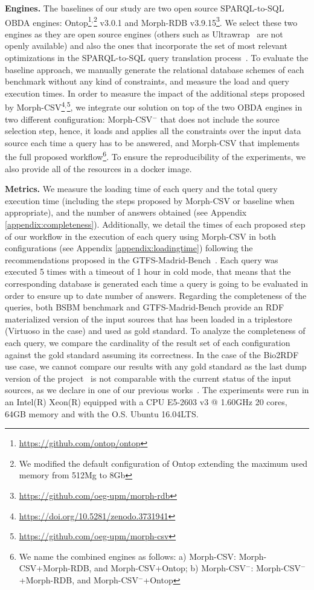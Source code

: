 \noindent\textbf{Engines.} The baselines of our study are two open source SPARQL-to-SQL OBDA engines: Ontop\footnote{\url{https://github.com/ontop/ontop}}$^,$\footnote{We modified the default configuration of Ontop extending the maximum used memory from 512Mg to 8Gb} v3.0.1 and Morph-RDB v3.9.15\footnote{\url{https://github.com/oeg-upm/morph-rdb}}. We select these two engines as they are open source engines (others such as Ultrawrap~\citep{sequeda2013ultrawrap} are not openly available) and also the ones that incorporate the set of most relevant optimizations in the SPARQL-to-SQL query translation process~\citep{priyatna2014formalisation,rodriguez2015efficient}.  To evaluate the baseline approach, we manually generate the relational database schemes of each benchmark without any kind of constraints, and measure the load and query execution times. In order to measure the impact of the additional steps proposed by Morph-CSV\footnote{\url{https://doi.org/10.5281/zenodo.3731941}}$^,$\footnote{\url{https://github.com/oeg-upm/morph-csv}}, we integrate our solution on top of the two OBDA engines in two different configuration: Morph-CSV$^-$ that does not include the source selection step, hence, it loads and applies all the constraints over the input data source each time a query has to be answered, and Morph-CSV that implements the full proposed workflow\footnote{We name the combined engines as follows: a) Morph-CSV: Morph-CSV+Morph-RDB, and Morph-CSV+Ontop; b) Morph-CSV$^-$: Morph-CSV$^-$+Morph-RDB, and Morph-CSV$^-$+Ontop}. To ensure the reproducibility of the experiments, we also provide all of the resources in a docker image.

\noindent\textbf{Metrics.} We measure the loading time of each query and the total query execution time (including the steps proposed by Morph-CSV or baseline when appropriate), and the number of answers obtained (see Appendix \ref{appendix:completeness}). Additionally, we detail the times of each proposed step of our workflow in the execution of each query using Morph-CSV in both configurations (see Appendix \ref{appendix:loadingtime}) following the recommendations proposed in the GTFS-Madrid-Bench~\citep{chaves2020gtfs}. Each query was executed 5 times with a timeout of 1 hour in cold mode, that means that the corresponding database is generated each time a query is going to be evaluated in order to ensure up to date number of answers. Regarding the completeness of the queries, both BSBM benchmark and GTFS-Madrid-Bench provide an RDF materialized version of the input sources that has been loaded in a triplestore (Virtuoso in the case) and used as gold standard. To analyze the completeness of each query, we compare the cardinality of the result set of each configuration against the gold standard assuming its correctness. In the case of the Bio2RDF use case, we cannot compare our results with any gold standard as the last dump version of the project~\citep{dumontier2014bio2rdf} is not comparable with the current status of the input sources, as we declare in one of our previous works~\citep{iglesias2019enhancing}. The experiments were run in an Intel(R) Xeon(R) equipped with a CPU E5-2603 v3 @ 1.60GHz 20 cores, 64GB memory and with the O.S. Ubuntu 16.04LTS.



